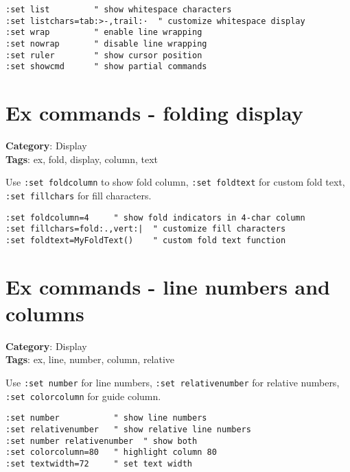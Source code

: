{{{{\begin{Exa*}{}
\begin{Verbatim}[fontsize=\footnotesize, breaklines, breakanywhere]
:set list         " show whitespace characters
:set listchars=tab:>-,trail:·  " customize whitespace display
:set wrap         " enable line wrapping
:set nowrap       " disable line wrapping
:set ruler        " show cursor position
:set showcmd      " show partial commands
\end{Verbatim}
\end{Exa*}

\section{Ex commands - folding display}

\textbf{Category}: Display\\ \textbf{Tags}: ex, fold, display, column, text
\vspace{0.5cm}

Use {\footnotesize \Verb§:set foldcolumn§} to show fold column, {\footnotesize \Verb§:set foldtext§} for custom fold text, {\footnotesize \Verb§:set fillchars§} for fill characters.

\begin{Exa*}{}
\begin{Verbatim}[fontsize=\footnotesize, breaklines, breakanywhere]
:set foldcolumn=4     " show fold indicators in 4-char column
:set fillchars=fold:.,vert:|  " customize fill characters
:set foldtext=MyFoldText()    " custom fold text function
\end{Verbatim}
\end{Exa*}

\section{Ex commands - line numbers and columns}

\textbf{Category}: Display\\ \textbf{Tags}: ex, line, number, column, relative
\vspace{0.5cm}

Use {\footnotesize \Verb§:set number§} for line numbers, {\footnotesize \Verb§:set relativenumber§} for relative numbers, {\footnotesize \Verb§:set colorcolumn§} for guide column.

\begin{Exa*}{}
\begin{Verbatim}[fontsize=\footnotesize, breaklines, breakanywhere]
:set number           " show line numbers
:set relativenumber   " show relative line numbers
:set number relativenumber  " show both
:set colorcolumn=80   " highlight column 80
:set textwidth=72     " set text width
\end{Verbatim}
\end{Exa*}

}}}}
